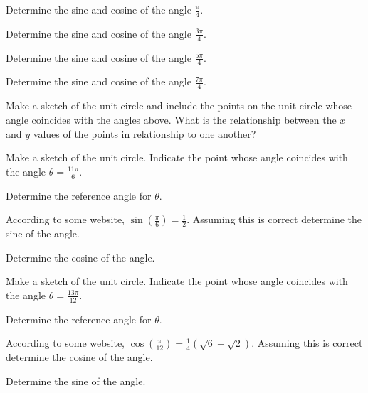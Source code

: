 
\begin{problem}
\item Determine the sine and cosine of the angle $\frac{\pi}{4}$.
  \vfill
\item Determine the sine and cosine of the angle $\frac{3\pi}{4}$.
  \vfill
\item Determine the sine and cosine of the angle $\frac{5\pi}{4}$.
  \vfill
\item Determine the sine and cosine of the angle $\frac{7\pi}{4}$.
  \vfill
\item Make a sketch of the unit circle and include the points on the
  unit circle whose angle coincides with the angles above. What is the
  relationship between the $x$ and $y$ values of the points in relationship
  to one another?
  \vfill
\end{problem}


\begin{problem}
\item Make a sketch of the unit circle. Indicate the point whose angle
  coincides with the angle $\theta=\frac{11\pi}{6}$.
  \begin{subproblem}
    \item Determine the reference angle for $\theta$.
      \vfill
    \item According to some website,
    $\displaystyle{\sin\left(\frac{\pi}{6}\right)=\frac{1}{2}}$.
    Assuming this is correct determine the sine of the angle.
      \vfill
    \item Determine the cosine of the angle.
      \vfill
  \end{subproblem}

  \clearpage

  \item Make a sketch of the unit circle. Indicate the point whose angle
    coincides with the angle $\theta=\frac{13\pi}{12}$.
    \begin{subproblem}
      \item Determine the reference angle for $\theta$.
        \vfill
      \item According to some website,
      $\displaystyle{\cos\left(\frac{\pi}{12}\right)=\frac{1}{4}\left( \sqrt{6} + \sqrt{2}\right)}$.
      Assuming this is correct determine the cosine of the angle.
        \vfill
      \item Determine the sine of the angle.
        \vfill
    \end{subproblem}


\end{problem}

